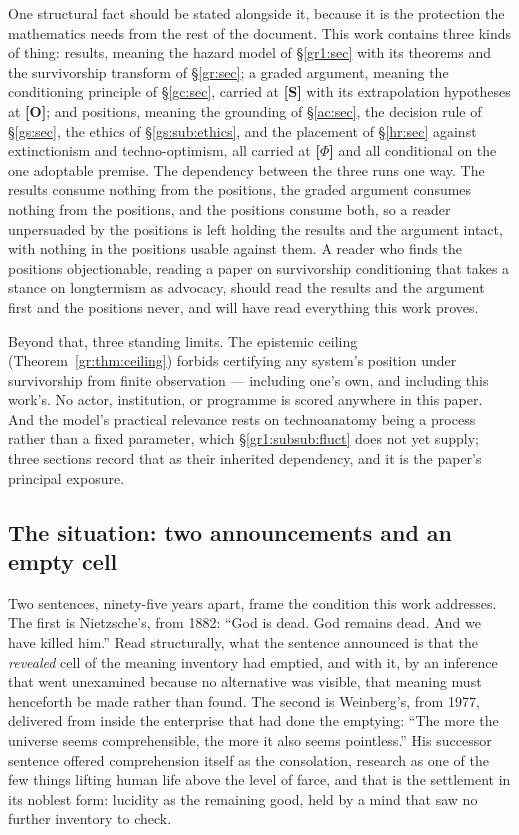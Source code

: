 \documentclass[11pt]{article}
\numberwithin{equation}{section}
\theoremstyle{plain}
\theoremstyle{definition}
\theoremstyle{remark}
\begin{document}
One structural fact should be stated alongside it, because it is the
protection the mathematics needs from the rest of the document. This
work contains three kinds of thing: results, meaning the hazard model
of \S\ref{gr1:sec} with its theorems and the survivorship transform
of \S\ref{gr:sec}; a graded argument, meaning the conditioning
principle of \S\ref{gc:sec}, carried at \textbf{[S]} with its
extrapolation hypotheses at \textbf{[O]}; and positions, meaning the
grounding of \S\ref{ac:sec}, the decision rule of \S\ref{gs:sec},
the ethics of \S\ref{gs:sub:ethics}, and the placement of
\S\ref{hr:sec} against extinctionism and techno-optimism, all
carried at \textbf{[$\Phi$]} and all conditional on the one
adoptable premise. The dependency between the three runs one way. The
results consume nothing from the positions, the graded argument
consumes nothing from the positions, and the positions consume both,
so a reader unpersuaded by the positions is left holding the results
and the argument intact, with nothing in the positions usable against
them. A reader who finds the positions objectionable, reading a paper
on survivorship conditioning that takes a stance on longtermism as
advocacy, should read the results and the argument first and the
positions never, and will have read everything this work proves.

Beyond that, three standing limits. The epistemic ceiling
(Theorem~\ref{gr:thm:ceiling}) forbids certifying any system's position
under survivorship from finite observation --- including one's own, and
including this work's. No actor, institution, or programme is scored
anywhere in this paper. And the model's practical relevance rests on
technoanatomy being a process rather than a fixed parameter, which
\S\ref{gr1:subsub:fluct} does not yet supply; three sections record that
as their inherited dependency, and it is the paper's principal exposure.

\subsection{The situation: two announcements and an empty cell}
\label{intro:sub:situation}

Two sentences, ninety-five years apart, frame the condition this
work addresses. The first is Nietzsche's, from 1882: ``God is dead.
God remains dead. And we have killed him.'' \cite{nietzsche1974gay}
Read structurally, what the sentence announced is that the
\emph{revealed} cell of the meaning inventory had emptied, and with
it, by an inference that went unexamined because no alternative was
visible, that meaning must henceforth be made rather than found. The
second is Weinberg's, from 1977, delivered from inside the
enterprise that had done the emptying: ``The more the universe seems
comprehensible, the more it also seems pointless.''
\cite{weinberg1977first} His successor sentence offered
comprehension itself as the consolation, research as one of the few
things lifting human life above the level of farce, and that is the
settlement in its noblest form: lucidity as the remaining good, held
by a mind that saw no further inventory to check.
\end{document}
